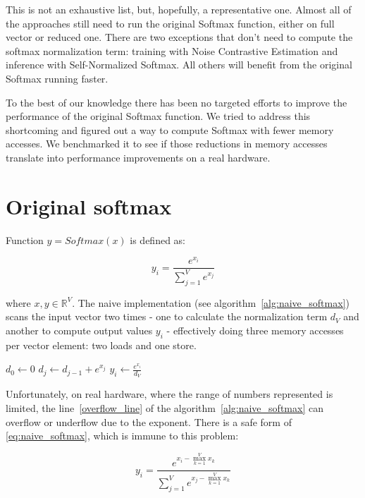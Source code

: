 This is not an exhaustive list, but, hopefully, a representative one. Almost all of the approaches still need to run the original Softmax function, either on full vector or reduced one. There are two exceptions that don't need to compute the softmax normalization term: training with Noise Contrastive Estimation and inference with Self-Normalized Softmax. All others will benefit from the original Softmax running faster.

To the best of our knowledge there has been no targeted efforts to improve the performance of the original Softmax function. We tried to address this shortcoming and figured out a way to compute Softmax with fewer memory accesses. We benchmarked it to see if those reductions in memory accesses translate into performance improvements on a real hardware.

\section{Original softmax} Function \(y=Softmax(x)\) is defined as:

\begin{equation}
\label{eq:naive_softmax}
y_i=\frac{e^{x_i}}{\sum\limits_{j=1}^{V}{e^{x_j}}}
\end{equation}

where \(x, y \in \mathbb{R}^V\). The naive implementation (see algorithm~\ref{alg:naive_softmax}) scans the input vector two times - one to calculate the normalization term $d_V$ and another to compute output values $y_i$ - effectively doing three memory accesses per vector element: two loads and one store.

\begin{algorithm}[ht]
\caption{Naive softmax}
\label{alg:naive_softmax}
\begin{algorithmic}[1]
\State $d_0\gets 0$
\State $d_j\gets d_{j-1}+e^{x_j}$ \label{overflow_line}
\EndFor
{}
\State $y_i\gets \frac{e^{x_i}}{d_V}$
\EndFor
\end{algorithmic}
\end{algorithm}

Unfortunately, on real hardware, where the range of numbers represented is limited, the line~\ref{overflow_line}  of the algorithm~\ref{alg:naive_softmax} can overflow or underflow due to the exponent. There is a safe form of \eqref{eq:naive_softmax}, which is immune to this problem:

\begin{equation}
\label{eq:safe_softmax}
y_i=\frac{e^{x_i-\max\limits_{k=1}^{V}{x_k}}}{\sum\limits_{j=1}^{V}{e^{x_j-\max\limits_{k=1}^{V}{x_k}}}}
\end{equation}

